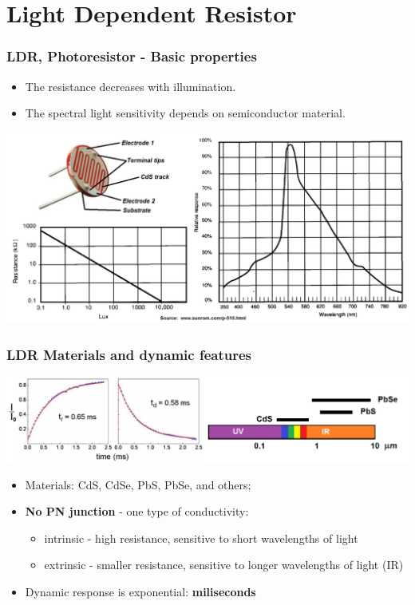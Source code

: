 \documentclass{beamer}
\begin{document}
\section{\texorpdfstring{Light Dependent Resistor}{Light Dependent Resistor}}
	\begin{frame}
    \frametitle{LDR, Photoresistor - Basic properties}
		\small
		\begin{itemize}
		\item The resistance decreases with illumination.
		\item The spectral light sensitivity depends on semiconductor material.
		\end{itemize}
		\includegraphics[scale=0.22]{obr01_fotoodpor.png}
	\end{frame}
	\begin{frame}
    \frametitle{LDR Materials and dynamic features}
		\begin{center}
			\includegraphics[scale=0.38]{obr03_materialyFO.png}
		\end{center}
		
		\begin{itemize}
		\item Materials: CdS, CdSe, PbS, PbSe, and others;
		\item \textbf{No PN junction} - one type of conductivity:
		\begin{itemize}
			\item intrinsic - high resistance, sensitive to short wavelengths of light
			\item extrinsic - smaller resistance, sensitive to longer wavelengths of light (IR)
		\end{itemize}
		\item Dynamic response is exponential: \textbf{miliseconds}
		\end{itemize}
	\end{frame}
\end{document}
